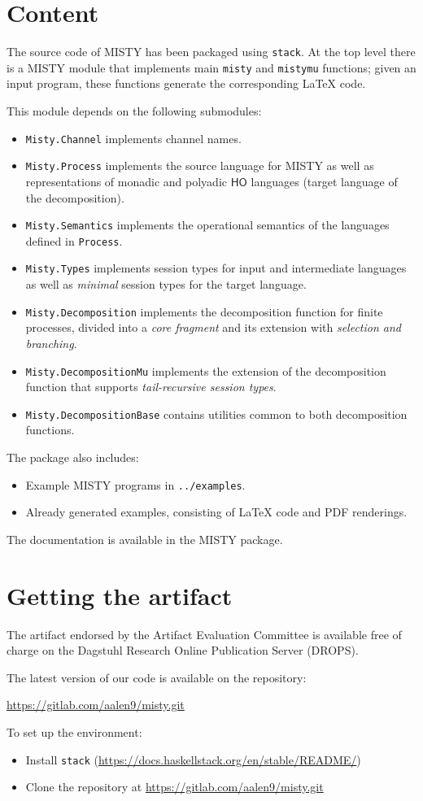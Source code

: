 \documentclass[a4paper,UKenglish]{darts-v2019}
\newenvironment{content}{\section{Content}}{}
\newenvironment{getting}{\section{Getting the artifact} The artifact 
endorsed by the Artifact Evaluation Committee is available free of 
charge on the Dagstuhl Research Online Publication Server (DROPS).}{}
\newcommand{\HO}{\ensuremath{\mathsf{HO}}\xspace}
\newcommand{\misty}{\textsf{MISTY}\xspace}
\begin{document}
\begin{content}
The source code of \misty has been packaged using \texttt{stack}.
At the top level there is a \misty module that implements main \texttt{misty} and \texttt{mistymu} functions; given an input program, these functions generate the corresponding \LaTeX\xspace code. 

This module depends on the following submodules: 
\begin{itemize}
	\item \texttt{Misty.Channel} implements channel names.
	\item \texttt{Misty.Process} implements the source language for \misty as well as representations of monadic and polyadic \HO languages (target language of the decomposition).
	\item \texttt{Misty.Semantics} implements the operational semantics of the languages defined in \texttt{Process}.
	\item \texttt{Misty.Types} implements session types for input and intermediate languages as well as \emph{minimal} session types for the target language.
	\item \texttt{Misty.Decomposition} implements the decomposition function for finite processes, divided into a \emph{core fragment} and its extension with \emph{selection and branching}.	
	\item \texttt{Misty.DecompositionMu} implements the extension of the decomposition function that supports \emph{tail-recursive session types}.
	\item \texttt{Misty.DecompositionBase} contains utilities common to both decomposition functions.
\end{itemize}

The package also includes:
\begin{itemize}
\item Example \misty programs in \texttt{../examples}.
\item Already generated examples, consisting of \LaTeX\xspace code and PDF renderings.
\end{itemize}
The documentation is available in the \misty package. 
\end{content}

\begin{getting}

The latest version of our code is available on the repository: 
\begin{center}
\url{https://gitlab.com/aalen9/misty.git}
\end{center}
To set up the environment: 
\begin{itemize}
\item Install \texttt{stack} (\url{https://docs.haskellstack.org/en/stable/README/})
\item Clone the repository at \url{https://gitlab.com/aalen9/misty.git}
\end{itemize}

\end{getting}
\end{document}
